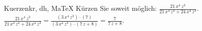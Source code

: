 \begin{MAufgabe}{Kuerzen}{kr, dh, MaTeX}
K\"urzen Sie soweit m\"oglich: $\frac{21\, x^4\, z^3}{21\, x^4\, z^4 + 24\, x^4\, z^3}$.\\ 
\ifLsg\MLoesung
\quad $\frac{21\, x^4\, z^3}{21\, x^4\, z^4 + 24\, x^4\, z^3}=\frac{(3\, x^4\, z^3)\cdot(7)}{(3\, x^4\, z^3)\cdot(7\, z + 8)}=\frac{7}{7\, z + 8}$.\else\relax\fi
 \end{MAufgabe}